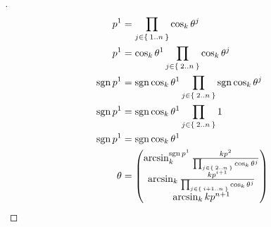 \documentclass[stu, babel, american, biblatex, a4paper, leqno, draftall]{apa7}
\begin{document}
\begin{proof}[]
\begin{align*}
        \tensor{p}{^1}                                                                     & = \prod_{j\in\Set{1..n}}{\cos_k{\tensor{\theta}{^j}}}                                                                 \\
        \tensor{p}{^1}                                                                     & = \cos_k{\tensor{\theta}{^1}}\prod_{j\in\Set{2..n}}{\cos_k{\tensor{\theta}{^j}}}                                      \\
        \sign{\tensor{p}{^1}}                                                              & = \sign{\cos_k{\tensor{\theta}{^1}}}\prod_{j\in\Set{2..n}}{\sign{\cos_k{\tensor{\theta}{^j}}}}                        \\
        \sign{\tensor{p}{^1}}                                                              & = \sign{\cos_k{\tensor{\theta}{^1}}}\prod_{j\in\Set{2..n}}{1}                                                         \\
        \sign{\tensor{p}{^1}}                                                              & = \sign{\cos_k{\tensor{\theta}{^1}}}                                                                                  \\
        \theta                                                                             & = \begin{pmatrix}
                                                                                                   \arcsin_k^{\sign{\tensor{p}{^1}}}{\frac{k\tensor{p}{^2}}{\prod_{j\in\Set{2..n}}{\cos_k{\tensor{\theta}{^j}}}}} \\
                                                                                                   \arcsin_k{\frac{k\tensor{p}{^{i+1}}}{\prod_{j\in\Set{i+1..n}}{\cos_k{\tensor{\theta}{^j}}}}}                   \\
                                                                                                   \arcsin_k{k\tensor{p}{^{n+1}}}                                                                                 \\
                                                                                               \end{pmatrix}
    \end{align*}
\end{proof}
\end{document}
